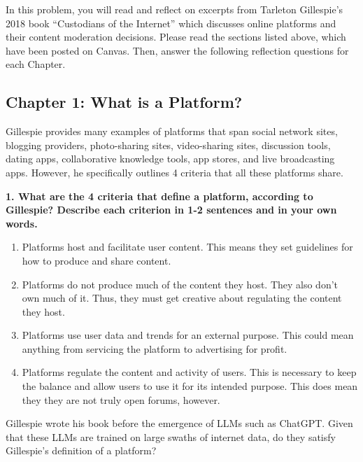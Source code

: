 \documentclass{article}
\begin{document}
\bigskip

In this problem, you will read and reflect on excerpts from Tarleton Gillespie's 2018 book ``Custodians of the Internet'' which discusses online platforms and their content moderation decisions. Please read the sections listed above, which have been posted on Canvas. Then, answer the following reflection questions for each Chapter.

\subsection*{Chapter 1: What is a Platform?}

Gillespie provides many examples of platforms that span social network sites, blogging providers, photo-sharing sites, video-sharing sites, discussion tools, dating apps, collaborative knowledge tools, app stores, and live broadcasting apps. However, he specifically outlines 4 criteria that all these platforms share.

\textbf{1. What are the 4 criteria that define a platform, according to Gillespie? Describe each criterion in 1-2 sentences and in your own words.}

\bigskip

\begin{mdframed}

\begin{enumerate}
    \item Platforms host and facilitate user content. This means they set guidelines for how to produce and share content. 
    \item Platforms do not produce much of the content they host. They also don't own much of it. Thus, they must get creative about regulating the content they host.
    \item Platforms use user data and trends for an external purpose. This could mean anything from servicing the platform to advertising for profit. 
    \item Platforms regulate the content and activity of users. This is necessary to keep the balance and allow users to use it for its intended purpose. This does mean they they are not truly open forums, however.
\end{enumerate}
\end{mdframed}

\bigskip

Gillespie wrote his book before the emergence of LLMs such as ChatGPT. Given that these LLMs are trained on large swaths of internet data, do they satisfy Gillespie's definition of a platform?
\end{document}
